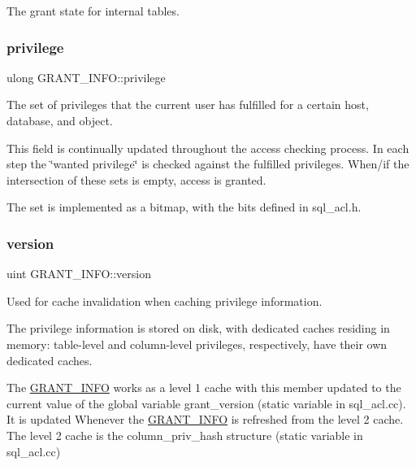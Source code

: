 The grant state for internal tables. \mbox{\label{structGRANT__INFO_a5fcbd105724d2b8bc497a3d149795f5e}} 
\subsubsection{\texorpdfstring{privilege}{privilege}}
{\footnotesize\ttfamily ulong G\+R\+A\+N\+T\+\_\+\+I\+N\+F\+O\+::privilege}



The set of privileges that the current user has fulfilled for a certain host, database, and object. 

This field is continually updated throughout the access checking process. In each step the \char`\"{}wanted privilege\char`\"{} is checked against the fulfilled privileges. When/if the intersection of these sets is empty, access is granted.

The set is implemented as a bitmap, with the bits defined in sql\+\_\+acl.\+h. \mbox{\label{structGRANT__INFO_a9fa219d89f9bbeca61f033a1d75c0ba2}} 
\subsubsection{\texorpdfstring{version}{version}}
{\footnotesize\ttfamily uint G\+R\+A\+N\+T\+\_\+\+I\+N\+F\+O\+::version}



Used for cache invalidation when caching privilege information. 

The privilege information is stored on disk, with dedicated caches residing in memory\+: table-\/level and column-\/level privileges, respectively, have their own dedicated caches.

The \mbox{\hyperlink{structGRANT__INFO}{G\+R\+A\+N\+T\+\_\+\+I\+N\+FO}} works as a level 1 cache with this member updated to the current value of the global variable {\ttfamily grant\+\_\+version} ({\ttfamily static} variable in sql\+\_\+acl.\+cc). It is updated Whenever the \mbox{\hyperlink{structGRANT__INFO}{G\+R\+A\+N\+T\+\_\+\+I\+N\+FO}} is refreshed from the level 2 cache. The level 2 cache is the {\ttfamily column\+\_\+priv\+\_\+hash} structure ({\ttfamily static} variable in sql\+\_\+acl.\+cc)

